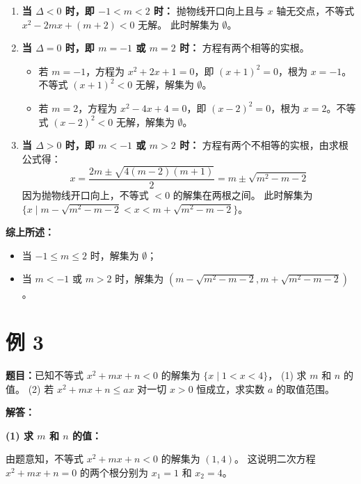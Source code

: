 \documentclass[UTF8]{article}
\begin{document}
	\begin{enumerate}
		\item \textbf{当 \(\Delta < 0\) 时，即 \(-1 < m < 2\) 时：}
		抛物线开口向上且与 \(x\) 轴无交点，不等式 \(x^2 - 2mx + (m+2) < 0\) 无解。
		此时解集为 \(\emptyset\)。
		
		\item \textbf{当 \(\Delta = 0\) 时，即 \(m = -1\) 或 \(m = 2\) 时：}
		方程有两个相等的实根。
		\begin{itemize}
			\item 若 \(m = -1\)，方程为 \(x^2 + 2x + 1 = 0\)，即 \((x+1)^2 = 0\)，根为 \(x = -1\)。不等式 \((x+1)^2 < 0\) 无解，解集为 \(\emptyset\)。
			\item 若 \(m = 2\)，方程为 \(x^2 - 4x + 4 = 0\)，即 \((x-2)^2 = 0\)，根为 \(x = 2\)。不等式 \((x-2)^2 < 0\) 无解，解集为 \(\emptyset\)。
		\end{itemize}
		
		\item \textbf{当 \(\Delta > 0\) 时，即 \(m < -1\) 或 \(m > 2\) 时：}
		方程有两个不相等的实根，由求根公式得：
		\[
		x = \frac{2m \pm \sqrt{4(m-2)(m+1)}}{2} = m \pm \sqrt{m^2 - m - 2}
		\]
		因为抛物线开口向上，不等式 \(< 0\) 的解集在两根之间。
		此时解集为 \(\{x \mid m - \sqrt{m^2 - m - 2} < x < m + \sqrt{m^2 - m - 2}\}\)。
	\end{enumerate}
	
	\textbf{综上所述：}
	\begin{itemize}
		\item 当 \(-1 \le m \le 2\) 时，解集为 \(\emptyset\)；
		\item 当 \(m < -1\) 或 \(m > 2\) 时，解集为 \((m - \sqrt{m^2 - m - 2}, m + \sqrt{m^2 - m - 2})\)。
	\end{itemize}
	
	\newpage
	

	
	\section*{例 3}
	\textbf{题目：}已知不等式 \(x^2 + mx + n < 0\) 的解集为 \(\{x \mid 1 < x < 4\}\)，
	(1) 求 \(m\) 和 \(n\) 的值。
	(2) 若 \(x^2 + mx + n \le ax\) 对一切 \(x > 0\) 恒成立，求实数 \(a\) 的取值范围。
	
	\vspace{0.5cm}
	\textbf{解答：}
	
	\textbf{(1) 求 \(m\) 和 \(n\) 的值：}
	
	由题意知，不等式 \(x^2 + mx + n < 0\) 的解集为 \((1, 4)\)。
	这说明二次方程 \(x^2 + mx + n = 0\) 的两个根分别为 \(x_1 = 1\) 和 \(x_2 = 4\)。
	
\end{document}
